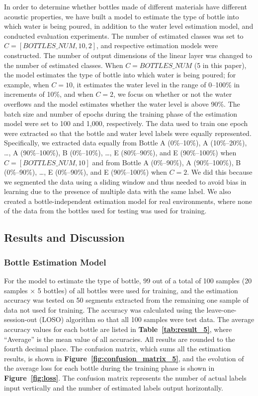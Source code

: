 \documentclass[sigconf]{acmart}
\newcommand\figref[1]{\textbf{Figure~\ref{fig:#1}}}
\newcommand\tabref[1]{\textbf{Table~\ref{tab:#1}}}
\begin{document}
In order to determine whether bottles made of different materials have different acoustic properties, we have built a model to estimate the type of bottle into which water is being poured, in addition to the water level estimation model, and conducted evaluation experiments. The number of estimated classes was set to $C=[BOTTLES\_NUM,10,2]$, and respective estimation models were constructed. The number of output dimensions of the linear layer was changed to the number of estimated classes. When $C=BOTTLES\_NUM$ (5 in this paper), the model estimates the type of bottle into which water is being poured; for example, when $C=10$, it estimates the water level in the range of 0--100\% in increments of 10\%, and when $C=2$, we focus on whether or not the water overflows and the model estimates whether the water level is above 90\%. The batch size and number of epochs during the training phase of the estimation model were set to 100 and 1,000, respectively. The data used to train one epoch were extracted so that the bottle and water level labels were equally represented. Specifically, we extracted data equally from Bottle A (0\%--10\%), A (10\%--20\%), \dots, A (90\%--100\%), B (0\%--10\%), \dots, E (80\%--90\%), and E (90\%--100\%) when $C=[BOTTLES\_NUM,10]$ and from Bottle A (0\%--90\%), A (90\%--100\%), B (0\%--90\%), \dots, E (0\%--90\%), and E (90\%--100\%) when $C=2$. We did this because we segmented the data using a sliding window and thus needed to avoid bias in learning due to the presence of multiple data with the same label. We also created a bottle-independent estimation model for real environments, where none of the data from the bottles used for testing was used for training.


\subsection{Results and Discussion}

\subsubsection{Bottle Estimation Model}
For the model to estimate the type of bottle, 99 out of a total of 100 samples (20 samples $\times$ 5 bottles) of all bottles were used for training, and the estimation accuracy was tested on 50 segments extracted from the remaining one sample of data not used for training. The accuracy was calculated using the leave-one-session-out (LOSO) algorithm so that all 100 samples were test data. The average accuracy values for each bottle are listed in \tabref{result_5}, where ``Average'' is the mean value of all accuracies. All results are rounded to the fourth decimal place. The confusion matrix, which sums all the estimation results, is shown in \figref{confusion_matrix_5}, and the evolution of the average loss for each bottle during the training phase is shown in \figref{loss}. The confusion matrix represents the number of actual labels input vertically and the number of estimated labels output horizontally.\par
\end{document}
